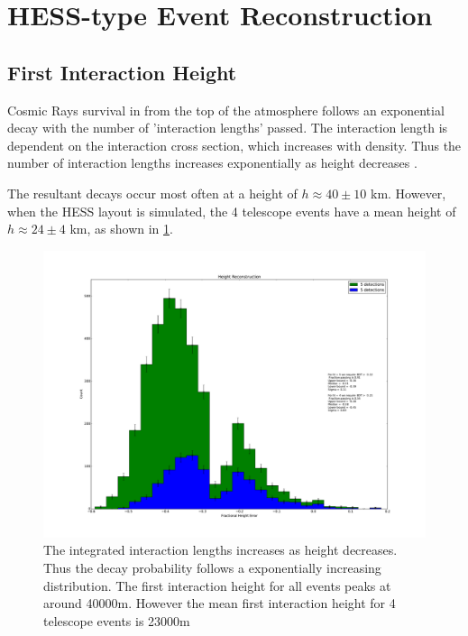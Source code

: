 \documentclass{article}
\begin{document}
\section{HESS-type Event Reconstruction}

\subsection{First Interaction Height}
Cosmic Rays survival in from the top of the atmosphere follows an exponential decay with the number of 'interaction lengths' passed. The interaction length is dependent on the interaction cross section, which increases with density. Thus the number of interaction lengths increases exponentially as height decreases . 

The resultant decays occur most often at a height of $h \approx 40 \pm 10$ km. However, when the HESS layout is simulated, the 4 telescope events have a mean height of $h \approx 24 \pm 4$ km, as shown in \ref{fig:Height Statistics}.

\begin{figure}
\begin{center}
\includegraphics[height=0.9\textheight]{height}
\caption{The integrated interaction lengths increases as height decreases. Thus the decay probability follows a exponentially increasing distribution. The first interaction height for all events peaks at around 40000m. However the mean first interaction height for 4 telescope events is 23000m}
\label{fig:Height Statistics}
\end{center}
\end{figure}
\end{document}
